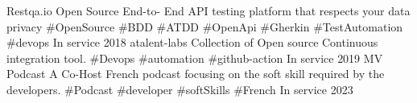 
\begin{cvhonors}

  \cvhonor
    {Restqa.io} %
    {Open Source End-to- End API testing platform that respects your data privacy \#OpenSource \#BDD  \#ATDD \#OpenApi \#Gherkin \#TestAutomation \#devops}
    {In service} %
    {2018} %
  \cvhonor
    {atalent-labs} %
    {Collection of Open source Continuous integration tool. \#Devops \#automation \#github-action}
    {In service} %
    {2019} %
  \cvhonor
    {MV Podcast} %
    {A Co-Host French podcast focusing on the soft skill required by the developers. \#Podcast \#developer \#softSkills \#French}
    {In service} %
    {2023} %
\end{cvhonors}

